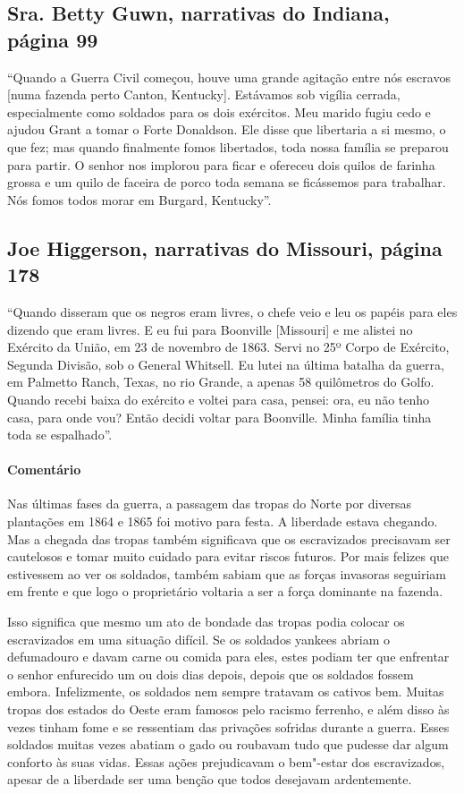 \subsection{Sra. Betty Guwn, narrativas do Indiana, página 99} \label{ref117}

``Quando a Guerra Civil começou, houve uma grande agitação entre nós
escravos {[}numa fazenda perto Canton, Kentucky{]}. Estávamos sob
vigília cerrada, especialmente como soldados para os dois exércitos. Meu
marido fugiu cedo e ajudou Grant a tomar o Forte Donaldson. Ele disse
que libertaria a si mesmo, o que fez; mas quando finalmente fomos
libertados, toda nossa família se preparou para partir. O senhor nos
implorou para ficar e ofereceu dois quilos de farinha grossa e um quilo
de faceira de porco toda semana se ficássemos para trabalhar. Nós fomos
todos morar em Burgard, Kentucky''.

\subsection{Joe Higgerson, narrativas do Missouri, página 178}
\label{ref144}

``Quando disseram que os negros eram livres, o chefe veio e leu os
papéis para eles dizendo que eram livres. E eu fui para Boonville
{[}Missouri{]} e me alistei no Exército da União, em 23 de novembro de
1863. Servi no 25º Corpo de Exército, Segunda Divisão, sob o General
Whitsell. Eu lutei na última batalha da guerra, em Palmetto Ranch,
Texas, no rio Grande, a apenas 58 quilômetros do Golfo. Quando recebi baixa do
exército e voltei para casa, pensei: ora, eu não tenho casa, para onde
vou? Então decidi voltar para Boonville. Minha família tinha toda se
espalhado''.

\paragraph{Comentário}\quad
{\small
Nas últimas fases da guerra, a passagem das tropas do Norte por
diversas plantações em 1864 e 1865 foi motivo para festa. A liberdade
estava chegando. Mas a chegada das tropas também significava que os
escravizados precisavam ser cautelosos e tomar muito cuidado para evitar
riscos futuros. Por mais felizes que estivessem ao ver os soldados,
também sabiam que as forças invasoras seguiriam em frente e que
logo o proprietário voltaria a ser a força dominante na fazenda.

Isso significa que mesmo um ato de bondade das tropas podia
colocar os escravizados em uma situação difícil. Se os soldados yankees
abriam o defumadouro e davam carne ou comida para eles, estes
podiam ter que enfrentar o senhor enfurecido um ou dois dias depois,
depois que os soldados fossem embora. Infelizmente, os soldados nem
sempre tratavam os cativos bem. Muitas tropas dos estados do Oeste eram
famosos pelo racismo ferrenho, e além disso às vezes tinham fome e se
ressentiam das privações sofridas durante a guerra. Esses soldados
muitas vezes abatiam o gado ou roubavam tudo que pudesse dar algum
conforto às suas vidas. Essas ações prejudicavam o bem"-estar dos
escravizados, apesar de a liberdade ser uma benção que todos desejavam
ardentemente.
}

